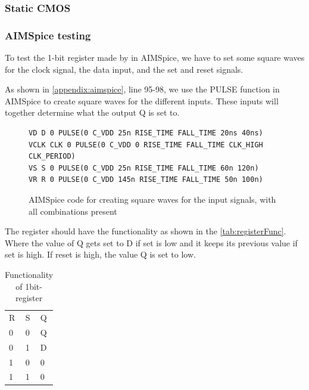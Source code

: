 \subsubsection{Static CMOS}


\subsubsection{AIMSpice testing}
To test the 1-bit register made by in AIMSpice, we have to set some square waves for the clock signal, the data input, and the set and reset signals.

As shown in \autoref{appendix:aimspice}, line 95-98, we use the PULSE function in AIMSpice to create square waves for the different inputs. These inputs will together determine what the output Q is set to.

\begin{figure}[H]
\centering
\label{fig:aimspice_pulses}
\begin{minipage}{\textwidth}
\begin{lstlisting}[style=aimspiceStyle]
VD D 0 PULSE(0 C_VDD 25n RISE_TIME FALL_TIME 20ns 40ns)
VCLK CLK 0 PULSE(0 C_VDD 0 RISE_TIME FALL_TIME CLK_HIGH CLK_PERIOD)
VS S 0 PULSE(0 C_VDD 25n RISE_TIME FALL_TIME 60n 120n)
VR R 0 PULSE(0 C_VDD 145n RISE_TIME FALL_TIME 50n 100n)
\end{lstlisting}
\end{minipage}
\caption{AIMSpice code for creating square waves for the input signals, with all combinations present}
\end{figure}

The register should have the functionality as shown in the \autoref{tab:registerFunc}. Where the value of Q gets set to D if set is low and it keeps its previous value if set is high. If reset is high, the value Q is set to low. 

\begin{table}[H]
\label{tab:registerFunc}
\centering
\caption{Functionality of 1bit-register}
\begin{tabular}{|l|l|l|}
\cline{1-3}
R & S & Q  \\ \cline{1-3}
0 & 0 & Q  \\ \cline{1-3}
0 & 1 & D  \\ \cline{1-3}
1 & 0 & 0  \\ \cline{1-3}
1 & 1 & 0  \\ \cline{1-3}
\end{tabular}
\end{table}


